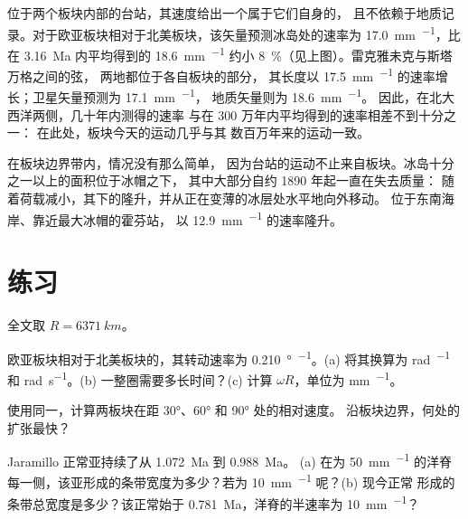 位于两个板块内部的台站，其速度给出一个属于它们自身的，
且不依赖于地质记录。对于欧亚板块相对于北美板块，该矢量预测冰岛处的速率为
\qty{17.0}{mm.^{-1}}，比在 \qty{3.16}{Ma} 内平均得到的
\qty{18.6}{mm.^{-1}} 约小 \qty{8}{\percent}（见上图）。雷克雅未克与斯塔万格之间的弦，
两地都位于各自板块的部分，
其长度以 \qty{17.5}{mm.^{-1}} 的速率增长；卫星矢量预测为 \qty{17.1}{mm.^{-1}}，
地质矢量则为 \qty{18.6}{mm.^{-1}}。
因此，在北大西洋两侧，几十年内测得的速率
与在 300 万年内平均得到的速率相差不到十分之一：
在此处，板块今天的运动几乎与其
数百万年来的运动一致。

在板块边界带内，情况没有那么简单，
因为台站的运动不止来自板块。冰岛十分之一以上的面积位于冰帽之下，
其中大部分自约 1890 年起一直在失去质量：
随着荷载减小，其下的隆升，并从正在变薄的冰层处水平地向外移动。
位于东南海岸、靠近最大冰帽的霍芬站，
以 \qty{12.9}{mm.^{-1}} 的速率隆升。

\section{练习}

全文取 $R = \qty{6371}{km}$。

\begin{exercise}[$\star$]\label{exo:b1:plate-kinematics:1}
欧亚板块相对于北美板块的，其转动速率为
\qty{0.210}{\degree\per\Ma}。(a) 将其换算为 \unit{rad.^{-1}} 和
\unit{rad.s^{-1}}。(b) 一整圈需要多长时间？(c) 计算 $\omega R$，单位为
\unit{mm.^{-1}}。
\end{exercise}

\begin{exercise}[$\star$]\label{exo:b1:plate-kinematics:2}
使用同一，计算两板块在距
\ang{30}、\ang{60} 和 \ang{90} 处的相对速度。
沿板块边界，何处的扩张最快？
\end{exercise}

\begin{exercise}[$\star$]\label{exo:b1:plate-kinematics:3}
Jaramillo 正常亚持续了从 \qty{1.072}{Ma} 到 \qty{0.988}{Ma}。
(a) 在为
\qty{50}{mm.^{-1}} 的洋脊每一侧，该亚形成的条带宽度为多少？若为 \qty{10}{mm.^{-1}} 呢？(b) 现今正常
形成的条带总宽度是多少？该正常始于
\qty{0.781}{Ma}，洋脊的半速率为 \qty{10}{mm.^{-1}}？
\end{exercise}

